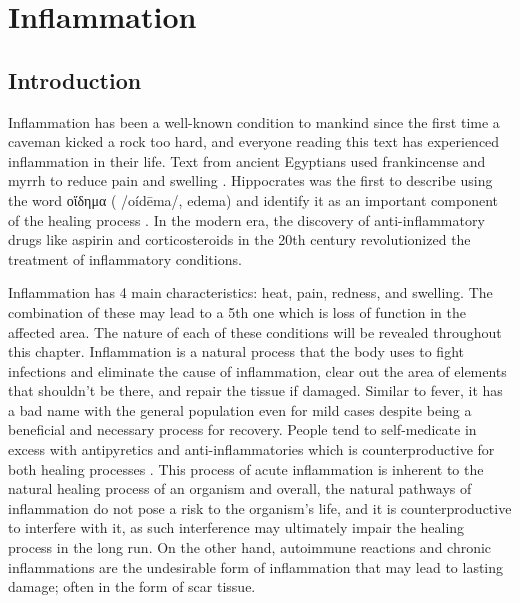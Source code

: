 \chapter{Inflammation}
\label{ch:inflammation}

\section{Introduction}

Inflammation has been a well-known condition to mankind since the first time a caveman kicked a rock too hard, and everyone reading this text has experienced inflammation in their life. Text from ancient Egyptians used frankincense and myrrh to reduce pain and swelling \cite{Kadioglu2016}. Hippocrates was the first to describe using the word οἴδημα ( /oídēma/, edema) and identify it as an important component of the healing process \cite{Touwaide1999}. In the modern era, the discovery of anti-inflammatory drugs like aspirin and corticosteroids in the 20th century revolutionized the treatment of inflammatory conditions. \cite{Granger2010}


Inflammation has 4 main characteristics: heat, pain, redness, and swelling. The combination of these may lead to a 5th one which is loss of function in the affected area. The nature of each of these conditions will be revealed throughout this chapter. Inflammation is a natural process that the body uses to fight infections and eliminate the cause of inflammation, clear out the area of elements that shouldn't be there, and repair the tissue if damaged. Similar to fever, it has a bad name with the general population even for mild cases despite being a beneficial and necessary process for recovery. People tend to self-medicate in excess with antipyretics and anti-inflammatories which is counterproductive for both healing processes \cite{Serhan2014}. This process of acute inflammation is inherent to the natural healing process of an organism and overall, the natural pathways of inflammation do not pose a risk to the organism's life, and it is counterproductive to interfere with it, as such interference may ultimately impair the healing process in the long run. On the other hand, autoimmune reactions and chronic inflammations are the undesirable form of inflammation that may lead to lasting damage; often in the form of scar tissue.

